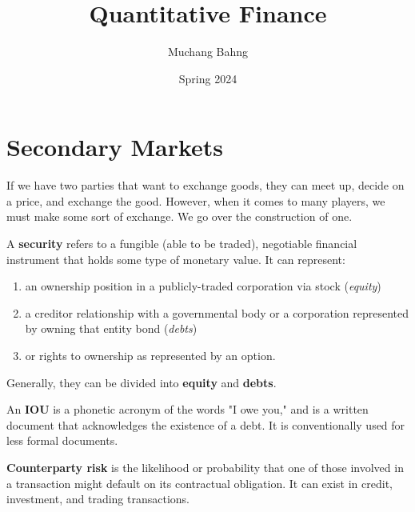 \documentclass{article}
\begin{document}
\title{Quantitative Finance}
\author{Muchang Bahng}
\date{Spring 2024}

\maketitle
\tableofcontents
\pagebreak

\section{Secondary Markets}

    If we have two parties that want to exchange goods, they can meet up, decide on a price, and exchange the good. However, when it comes to many players, we must make some sort of exchange. We go over the construction of one. 

    \begin{definition}[Securities]
      A \textbf{security} refers to a fungible (able to be traded), negotiable financial instrument that holds some type of monetary value. It can represent: 
      \begin{enumerate}
          \item an ownership position in a publicly-traded corporation via stock (\textit{equity})
          \item a creditor relationship with a governmental body or a corporation represented by owning that entity bond (\textit{debts})
          \item or rights to ownership as represented by an option. 
      \end{enumerate}
      Generally, they can be divided into \textbf{equity} and \textbf{debts}. 
    \end{definition}

    \begin{definition}[IOU]
      An \textbf{IOU} is a phonetic acronym of the words "I owe you," and is a written document that acknowledges the existence of a debt. It is conventionally used for less formal documents. 
    \end{definition}

    \begin{definition}
      \textbf{Counterparty risk} is the likelihood or probability that one of those involved in a transaction might default on its contractual obligation. It can exist in credit, investment, and trading transactions. 
    \end{definition}
\end{document}
